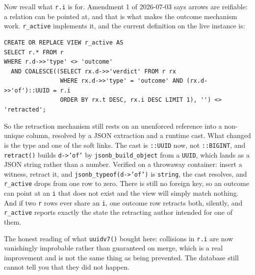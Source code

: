 Now recall what \texttt{r.i} is for. Amendment 1 of 2026-07-03 says arrows are reifiable: a relation can be pointed at, and that is what makes the outcome mechanism work. \texttt{r\_active} implements it, and the current definition on the live instance is:

\begin{lstlisting}
CREATE OR REPLACE VIEW r_active AS
SELECT r.* FROM r
WHERE r.d->>'type' <> 'outcome'
  AND COALESCE((SELECT rx.d->>'verdict' FROM r rx
                WHERE rx.d->>'type' = 'outcome' AND (rx.d->>'of')::UUID = r.i
                ORDER BY rx.t DESC, rx.i DESC LIMIT 1), '') <> 'retracted';
\end{lstlisting}

So the retraction mechanism still rests on an unenforced reference into a non-unique column, resolved by a JSON extraction and a runtime cast. What changed is the type and one of the soft links. The cast is \verb|::UUID| now, not \verb|::BIGINT|, and \texttt{retract()} builds \texttt{d->'of'} by \texttt{jsonb\_build\_object} from a \texttt{UUID}, which lands as a JSON string rather than a number. Verified on a throwaway container: insert a witness, retract it, and \texttt{jsonb\_typeof(d->'of')} is \texttt{string}, the cast resolves, and \texttt{r\_active} drops from one row to zero. There is still no foreign key, so an outcome can point at an \texttt{i} that does not exist and the view will simply match nothing. And if two \texttt{r} rows ever share an \texttt{i}, one outcome row retracts both, silently, and \texttt{r\_active} reports exactly the state the retracting author intended for one of them.

The honest reading of what \texttt{uuidv7()} bought here: collisions in \texttt{r.i} are now vanishingly improbable rather than guaranteed on merge, which is a real improvement and is not the same thing as being prevented. The database still cannot tell you that they did not happen.

